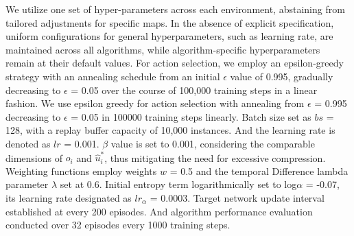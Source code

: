 We utilize one set of hyper-parameters across each environment, abstaining from tailored adjustments for specific maps.  In the absence of explicit specification, uniform configurations for general hyperparameters, such as learning rate, are maintained across all algorithms, while algorithm-specific hyperparameters remain at their default values. For action selection, we employ an epsilon-greedy strategy with an annealing schedule from an initial $\epsilon$ value of 0.995, gradually decreasing to $\epsilon$ = 0.05 over the course of 100,000 training steps in a linear fashion.
We use epsilon greedy for action selection with annealing from $\epsilon$ = 0.995 decreasing to $\epsilon$ = 0.05 in 100000 training steps linearly. 
Batch size set as $bs$ = 128, with a replay buffer capacity of 10,000 instances. And the learning rate is denoted as $lr$ = 0.001.
$\beta$ value is set to 0.001, considering the comparable dimensions of $o_i$ and $\hat{u}^*_i$, thus mitigating the need for excessive compression.
Weighting functions employ weights $w$ = 0.5 and the temporal Difference lambda parameter $\lambda$ set at 0.6.
Initial entropy term logarithmically set to log$\alpha$ = -0.07, its learning rate designated as $lr_{\alpha}$ = 0.0003.
Target network update interval established at every 200 episodes. And
algorithm performance evaluation conducted over 32 episodes every 1000 training steps.

